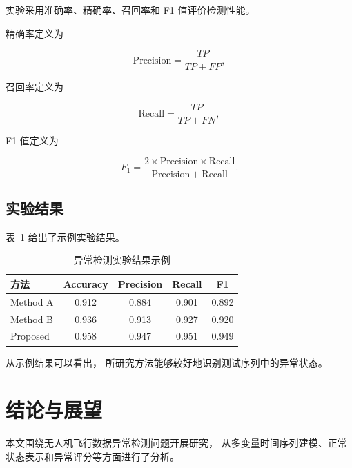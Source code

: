 \documentclass[
  degree=master,
  degree-type=academic
]{gzuthesis}
\begin{document}
实验采用准确率、精确率、召回率和 F1 值评价检测性能。

精确率定义为

\begin{equation}
    \mathrm{Precision}
    =
    \frac{TP}{TP+FP},
\end{equation}

召回率定义为

\begin{equation}
    \mathrm{Recall}
    =
    \frac{TP}{TP+FN},
\end{equation}

F1 值定义为

\begin{equation}
    F_1
    =
    \frac{
        2 \times \mathrm{Precision} \times \mathrm{Recall}
    }{
        \mathrm{Precision} + \mathrm{Recall}
    }.
\end{equation}


\section{实验结果}

表~\ref{tab:result} 给出了示例实验结果。

\begin{table}[htbp]
    \centering
    \caption{异常检测实验结果示例}
    \label{tab:result}
    \begin{tabular}{lcccc}
        \toprule
        方法 & Accuracy & Precision & Recall & F1 \\
        \midrule
        Method A & 0.912 & 0.884 & 0.901 & 0.892 \\
        Method B & 0.936 & 0.913 & 0.927 & 0.920 \\
        Proposed & 0.958 & 0.947 & 0.951 & 0.949 \\
        \bottomrule
    \end{tabular}
\end{table}

从示例结果可以看出，
所研究方法能够较好地识别测试序列中的异常状态。



\chapter{结论与展望}

本文围绕无人机飞行数据异常检测问题开展研究，
从多变量时间序列建模、正常状态表示和异常评分等方面进行了分析。
\end{document}
